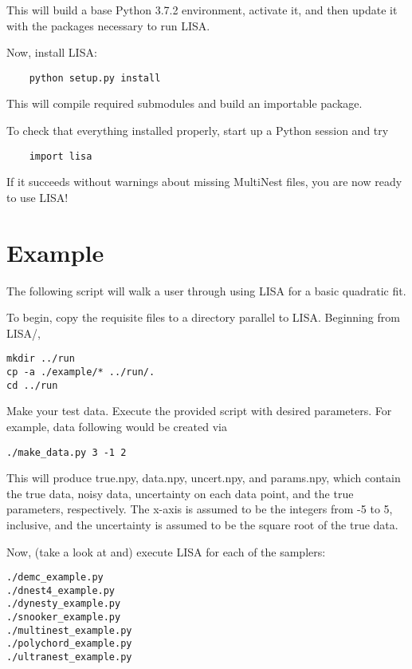 \documentclass[letterpaper, 12pt]{article}
\begin{document}
\noindent This will build a base Python 3.7.2 environment, activate it, and then update 
it with the packages necessary to run LISA.\newline

\noindent Now, install LISA:
\begin{verbatim}
    python setup.py install
\end{verbatim}
\noindent This will compile required submodules and build an importable 
package.\newline

\noindent To check that everything installed properly, start up a Python 
session and try 
\begin{verbatim}
    import lisa
\end{verbatim}
\noindent If it succeeds without warnings about missing MultiNest files, 
you are now ready to use LISA!


\section{Example}
\label{sec:example}

The following script will walk a user through using LISA for a basic quadratic 
fit.

\noindent To begin, copy the requisite files to a directory parallel to LISA. 
Beginning from LISA/, 
\begin{verbatim}
mkdir ../run
cp -a ./example/* ../run/.
cd ../run
\end{verbatim}

\noindent Make your test data.  Execute the provided script with 
desired parameters.  For example, data following  
would be created via
\begin{verbatim}
./make_data.py 3 -1 2
\end{verbatim}
\noindent This will produce true.npy, data.npy, uncert.npy, and params.npy, 
which contain the true data, noisy data, uncertainty on each data point, and 
the true parameters, respectively.  The x-axis is assumed to be the integers 
from -5 to 5, inclusive, and the uncertainty is assumed to be the square root 
of the true data.\newline

\noindent Now, (take a look at and) execute LISA for each of the samplers:

\begin{verbatim}
./demc_example.py
./dnest4_example.py
./dynesty_example.py
./snooker_example.py
./multinest_example.py
./polychord_example.py
./ultranest_example.py
\end{verbatim}
\end{document}
